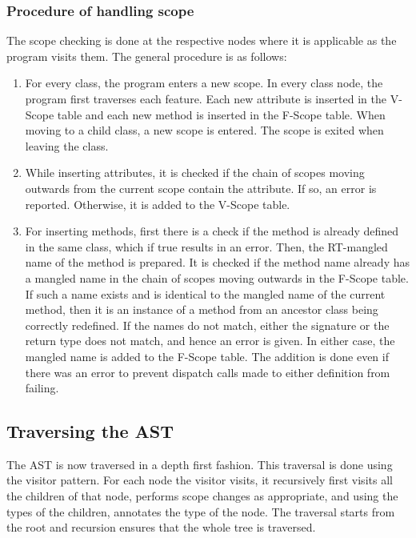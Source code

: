 \documentclass{article}
\begin{document}
\subsubsection*{Procedure of handling scope}
The scope checking is done at the respective nodes where it is applicable as the program visits them. The general procedure is as follows:
\begin{enumerate}
	\item For every class, the program enters a new scope. In every class node, the program first traverses each feature. Each new attribute is inserted in the V-Scope table and each new method is inserted in the F-Scope table. When moving to a child class, a new scope is entered. The scope is exited when leaving the class.
	\item While inserting attributes, it is checked if the chain of scopes moving outwards from the current scope contain the attribute. If so, an error is reported. Otherwise, it is added to the V-Scope table.
	\item For inserting methods, first there is a check if the method is already defined in the same class, which if true results in an error. Then, the RT-mangled name of the method is prepared. It is checked if the method name already has a mangled name in the chain of scopes moving outwards in the F-Scope table. If such a name exists and is identical to the mangled name of the current method, then it is an instance of a method from an ancestor class being correctly redefined. If the names do not match, either the signature or the return type does not match, and hence an error is given. In either case, the mangled name is added to the F-Scope table. The addition is done even if there was an error to prevent dispatch calls made to either definition from failing.
\end{enumerate}

\subsection*{Traversing the AST}
The AST is now traversed in a depth first fashion. This traversal is done using the visitor pattern. For each node the visitor visits, it recursively first visits all the children of that node, performs scope changes as appropriate, and using the types of the children, annotates the type of the node. The traversal starts from the root and recursion ensures that the whole tree is traversed.
\end{document}
